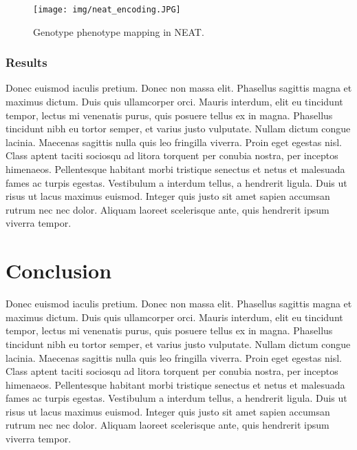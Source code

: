\documentclass[format=acmsmall, review=false, screen=true]{acmart}
\begin{document}
\begin{figure}[H]
  \texttt{[image: img/neat\_encoding.JPG]}
  \caption{Genotype phenotype mapping in NEAT.}
  \label{fig:encoding}
\end{figure}

\subsubsection{Results}

Donec euismod iaculis pretium. Donec non massa elit. Phasellus sagittis magna et maximus dictum. Duis quis ullamcorper orci. Mauris interdum, elit eu tincidunt tempor, lectus mi venenatis purus, quis posuere tellus ex in magna. Phasellus tincidunt nibh eu tortor semper, et varius justo vulputate. Nullam dictum congue lacinia. Maecenas sagittis nulla quis leo fringilla viverra. Proin eget egestas nisl. Class aptent taciti sociosqu ad litora torquent per conubia nostra, per inceptos himenaeos. Pellentesque habitant morbi tristique senectus et netus et malesuada fames ac turpis egestas. Vestibulum a interdum tellus, a hendrerit ligula. Duis ut risus ut lacus maximus euismod. Integer quis justo sit amet sapien accumsan rutrum nec nec dolor. Aliquam laoreet scelerisque ante, quis hendrerit ipsum viverra tempor.

\section{Conclusion}

Donec euismod iaculis pretium. Donec non massa elit. Phasellus sagittis magna et maximus dictum. Duis quis ullamcorper orci. Mauris interdum, elit eu tincidunt tempor, lectus mi venenatis purus, quis posuere tellus ex in magna. Phasellus tincidunt nibh eu tortor semper, et varius justo vulputate. Nullam dictum congue lacinia. Maecenas sagittis nulla quis leo fringilla viverra. Proin eget egestas nisl. Class aptent taciti sociosqu ad litora torquent per conubia nostra, per inceptos himenaeos. Pellentesque habitant morbi tristique senectus et netus et malesuada fames ac turpis egestas. Vestibulum a interdum tellus, a hendrerit ligula. Duis ut risus ut lacus maximus euismod. Integer quis justo sit amet sapien accumsan rutrum nec nec dolor. Aliquam laoreet scelerisque ante, quis hendrerit ipsum viverra tempor.

\medskip

\newpage


\end{document}
